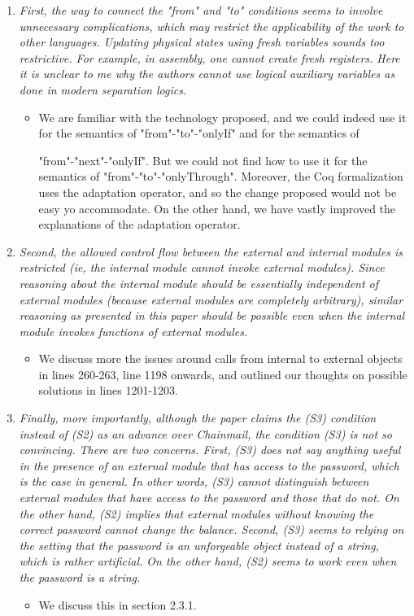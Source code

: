 \documentclass[11pt]{amsart}
\begin{document}
\begin{enumerate}
 
 
\item
\emph{
 First, the way to connect the "from" and "to" conditions seems to involve unnecessary complications, which may restrict the applicability of the work to other languages. Updating physical states using fresh variables sounds too restrictive. For example, in assembly, one cannot create fresh registers. Here it is unclear to me why the authors cannot use logical auxiliary variables as done in modern separation logics.
 }
 \begin{itemize}
\item  
 We are familiar with the technology proposed, and we could indeed use it for the semantics of  "from"-"to"-"onlyIf" and for the semantics of 

 "from"-"next"-"onlyIf". But we could not find how to use it for the semantics of "from"-"to"-"onlyThrough". Moreover, the Coq formalization uses the adaptation operator, and so the change proposed would not be easy yo accommodate. On the other hand, we have vastly improved the explanations of  the adaptation operator.
 \end{itemize}
 
\item
\emph{
 Second, the allowed control flow between the external and internal modules is restricted (ie, the internal module cannot invoke external modules). Since reasoning about the internal module should be essentially independent of external modules (because external modules are completely arbitrary), similar reasoning as presented in this paper should be possible even when the internal module invokes functions of external modules. }
 \begin{itemize}
\item  
 We discuss more the issues around calls from internal to external objects in lines  260-263, line 1198 onwards, and outlined our thoughts on possible solutions in lines 1201-1203.
 \end{itemize}

\item
\emph{
Finally, more importantly, although the paper claims the (S3) condition instead of (S2) as an advance over Chainmail, the condition (S3) is not so convincing. There are two concerns. First, (S3) does not say anything useful in the presence of an external module that has access to the password, which is the case in general. In other words, (S3) cannot distinguish between external modules that have access to the password and those that do not. On the other hand, (S2) implies that external modules without knowing the correct password cannot change the balance. Second, (S3) seems to relying on the setting that the password is an unforgeable object instead of a string, which is rather artificial. On the other hand, (S2) seems to work even when the password is a string. }
 \begin{itemize}
\item  
 We discuss this in section 2.3.1.
 \end{itemize}
 
 \end{enumerate} 
\end{document}
